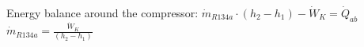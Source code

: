Energy balance around the compressor:  
\( \dot{m}_{R134a} \cdot (h_2 - h_1) - \dot{W}_K = \dot{Q}_{ab} \)  
\( \dot{m}_{R134a} = \frac{\dot{W}_K}{(h_2 - h_1)} \)